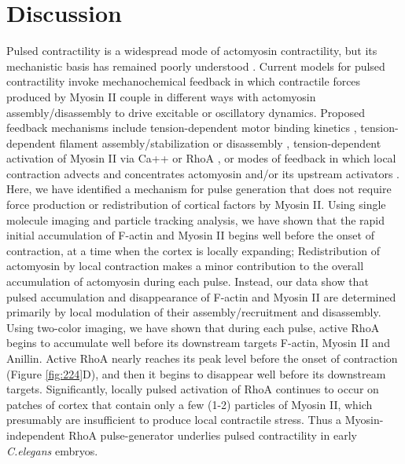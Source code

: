 \section{Discussion}
Pulsed contractility is a widespread mode of actomyosin contractility, but its mechanistic basis has remained poorly understood  \cite{Levayer:2012bu, Gorfinkiel:2016bv}. Current models for pulsed contractility invoke mechanochemical feedback in which contractile forces produced by Myosin II couple in different ways with actomyosin assembly/disassembly to drive excitable or oscillatory dynamics. Proposed feedback mechanisms include tension-dependent motor binding kinetics  \cite{Ren:2009ep, Effler:2006hc, Luo:2012bl}, tension-dependent filament assembly/stabilization  \cite{Hayakawa:2011dq, DeLaCruz:2015dj} or disassembly  \cite{Machado:2014fx}, tension-dependent activation of Myosin II via Ca++  \cite{Kapustina:2008ds} or RhoA  \cite{Koride:2014hp}, or modes of feedback in which local contraction advects and concentrates actomyosin and/or its upstream activators  \cite{Bois:2011kx, Kumar:2014ux, Munjal:2015bx}.  Here, we have identified a mechanism for pulse generation that does not require force production or redistribution of cortical factors by Myosin II.  Using single molecule imaging and particle tracking analysis, we have shown that the rapid initial accumulation of F-actin and Myosin II begins well before the onset of contraction, at a time when the cortex is locally expanding; Redistribution of actomyosin by local contraction makes a minor contribution to the overall accumulation of actomyosin during each pulse.  Instead, our data show that pulsed accumulation and disappearance of F-actin and Myosin II are determined primarily by local modulation of their assembly/recruitment and disassembly. Using two-color imaging, we have shown that during each pulse, active RhoA begins to accumulate well before its downstream targets F-actin, Myosin II and Anillin. Active RhoA nearly reaches its peak level before the onset of contraction (Figure \ref{fig:224}D), and then it begins to disappear well before its downstream targets. Significantly, locally pulsed activation of RhoA continues to occur on patches of cortex that contain only a few (1-2) particles of Myosin II, which presumably are insufficient to produce local contractile stress. Thus a Myosin-independent RhoA pulse-generator underlies pulsed contractility in early \textit{C.elegans} embryos.


